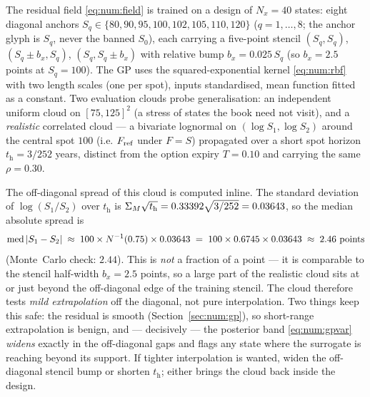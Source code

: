 \begin{example}\label{ex:num:gpdesign}
The residual field \eqref{eq:num:field} is trained on a design of $N_{x} = 40$
states: eight diagonal anchors $S_q \in \{80,90,95,100,102,105,110,120\}$
($q = 1,\dots,8$; the anchor glyph is $S_q$, never the banned $S_0$), each
carrying a five-point stencil $(S_q,S_q)$, $(S_q\pm b_x, S_q)$,
$(S_q, S_q\pm b_x)$ with relative bump $b_x = 0.025\,S_q$ (so $b_x = 2.5$ points
at $S_q = 100$). The GP uses the squared-exponential kernel \eqref{eq:num:rbf}
with two length scales (one per spot), inputs standardised, mean function fitted
as a constant. Two evaluation clouds probe generalisation: an independent uniform
cloud on $[75,125]^2$ (a stress of states the book need not visit), and a
\emph{realistic} correlated cloud --- a bivariate lognormal on
$(\log S_1, \log S_2)$ around the central spot $100$ (i.e. $F_{\mathrm{ref}}$ under $F=S$)
propagated over a short spot horizon $t_{\mathrm h} = 3/252$ years, distinct from
the option expiry $T = 0.10$ and carrying the same $\rho = 0.30$.

The off-diagonal spread of this cloud is computed inline.
The standard deviation of $\log(S_1/S_2)$ over $t_{\mathrm h}$ is
$\Sigma_M\sqrt{t_{\mathrm h}} = 0.33392\sqrt{3/252} = 0.03643$, so the median
absolute spread is
\[
   \operatorname{med}|S_1 - S_2|
   \;\approx\; 100 \times N^{-1}(0.75) \times 0.03643
   \;=\; 100 \times 0.6745 \times 0.03643
   \;\approx\; 2.46 \text{ points}
\]
(Monte~Carlo check: $2.44$). This is \emph{not} a fraction of a point --- it is
comparable to the stencil half-width $b_x = 2.5$ points, so a large part of the
realistic cloud sits at or just beyond the off-diagonal edge of the training
stencil. The cloud therefore tests \emph{mild
extrapolation} off the diagonal, not pure interpolation. Two things keep this
safe: the residual is smooth (Section~\ref{sec:num:gp}), so short-range
extrapolation is benign, and --- decisively --- the posterior band
\eqref{eq:num:gpvar} \emph{widens} exactly in the off-diagonal gaps and flags any
state where the surrogate is reaching beyond its support. If tighter interpolation
is wanted, widen the off-diagonal stencil bump or shorten $t_{\mathrm h}$; either
brings the cloud back inside the design.
\end{example}

